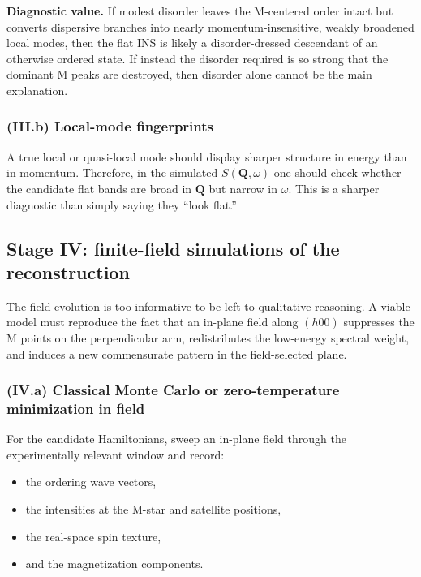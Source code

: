 \documentclass[11pt]{article}
\begin{document}
\textbf{Diagnostic value.} If modest disorder leaves the M-centered order intact but converts dispersive branches into nearly momentum-insensitive, weakly broadened local modes, then the flat INS is likely a disorder-dressed descendant of an otherwise ordered state. If instead the disorder required is so strong that the dominant M peaks are destroyed, then disorder alone cannot be the main explanation.

\subsubsection*{(III.b) Local-mode fingerprints}

A true local or quasi-local mode should display sharper structure in energy than in momentum. Therefore, in the simulated $S(\mathbf{Q},\omega)$ one should check whether the candidate flat bands are broad in $\mathbf{Q}$ but narrow in $\omega$. This is a sharper diagnostic than simply saying they ``look flat.''

\subsection{Stage IV: finite-field simulations of the reconstruction}

The field evolution is too informative to be left to qualitative reasoning. A viable model must reproduce the fact that an in-plane field along $(h00)$ suppresses the M points on the perpendicular arm, redistributes the low-energy spectral weight, and induces a new commensurate pattern in the field-selected plane.

\subsubsection*{(IV.a) Classical Monte Carlo or zero-temperature minimization in field}

For the candidate Hamiltonians, sweep an in-plane field through the experimentally relevant window and record:
\begin{itemize}[leftmargin=2em,itemsep=0.35em]
    \item the ordering wave vectors,
    \item the intensities at the M-star and satellite positions,
    \item the real-space spin texture,
    \item and the magnetization components.
\end{itemize}
\end{document}
